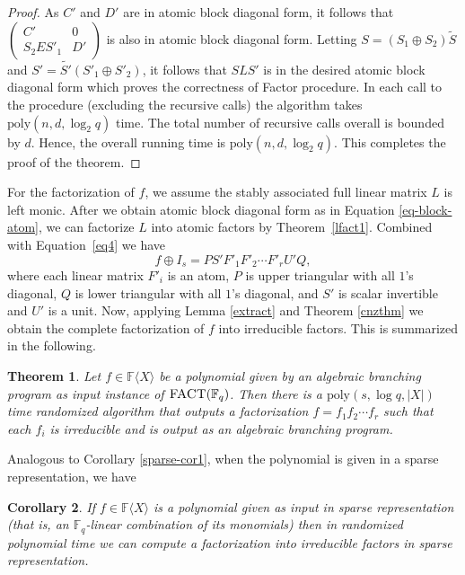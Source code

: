 \documentclass[10pt,a4paper]{article}
\newtheorem{theorem}{Theorem}[section]
\newtheorem{corollary}[theorem]{Corollary}
\newcommand{\F}{\mathbb{F}}
\renewcommand{\angle}[1]{\langle #1 \rangle}
\newcommand{\FX}{\F\angle{X}}
\newcommand{\poly}{\mathrm{poly}}
\newcommand{\fR}{\FX}
\newcommand{\prob}[1]{\textsc{#1}}
\begin{document}
\begin{proof}
As $C'$ and $D'$ are in atomic block diagonal form, it follows that
$\left(
\begin{array}{cc}
C' & 0 \\
S_2ES'_1 & D'
\end{array}
\right)$ is also in atomic block diagonal form. Letting $S=(S_1 \oplus
S_2) \tilde{S}$ and $S'=\tilde{S'}(S'_1 \oplus S'_2)$, it follows that
$SLS'$ is in the desired atomic block diagonal form which proves the
correctness of Factor procedure. In each call to the procedure
(excluding the recursive calls) the algorithm takes
$\poly(n,d,\log_2q)$ time. The total number of recursive calls overall
is bounded by $d$. Hence, the overall running time is
$\poly(n,d,\log_2q)$. This completes the proof of the theorem.
\end{proof}

For the factorization of $f$, we assume the stably associated full
linear matrix $L$ is left monic. After we obtain atomic block
diagonal form as in Equation \ref{eq-block-atom}, we can factorize $L$
into atomic factors by Theorem~\ref{lfact1}. Combined with
Equation~\ref{eq4} we have
\begin{equation*}
f\oplus I_s = PS'F'_1F'_2\cdots F'_r U'Q,
\end{equation*}
where each linear matrix $F'_i$ is an atom, $P$ is upper triangular
with all $1$'s diagonal, $Q$ is lower triangular with all $1$'s
diagonal, and $S'$ is scalar invertible and $U'$ is a unit. Now,
applying Lemma \ref{extract} and Theorem \ref{cnzthm} we obtain the
complete factorization of $f$ into irreducible factors. This is
summarized in the following.

\begin{theorem}\label{comzthm}  
  Let $f\in \fR$ be a polynomial given by an algebraic branching
  program as input instance of $\prob{FACT}(\F_q)$. Then there is a
  $\poly(s, \log q,|X|)$ time randomized algorithm that outputs a
  factorization $f=f_1f_2\cdots f_r$ such that each $f_i$ is
  irreducible and is output as an algebraic branching program.
\end{theorem}

Analogous to Corollary \ref{sparse-cor1}, when the polynomial is given
in a sparse representation, we have 

\begin{corollary} \label{sparse-comnz}
If $f\in\fR$ is a polynomial given as input in sparse representation
(that is, an $\F_q$-linear combination of its monomials) then in
randomized polynomial time we can compute a factorization into
irreducible factors in sparse representation.
\end{corollary}
\end{document}
